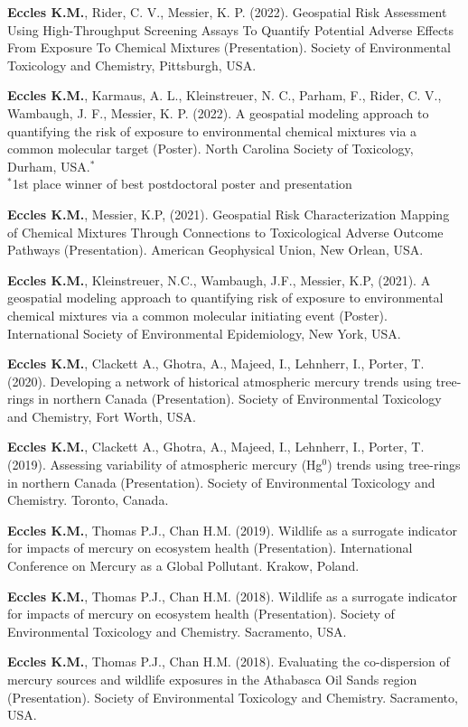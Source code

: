 \documentclass[margin,line]{res}
\begin{document}
\begin{resume}
\textbf{Eccles K.M.}, Rider, C. V., Messier, K. P. (2022). Geospatial Risk Assessment Using High-Throughput Screening Assays To Quantify Potential Adverse Effects From Exposure To Chemical Mixtures (Presentation). Society of Environmental Toxicology and Chemistry, Pittsburgh, USA.

\textbf{Eccles K.M.}, Karmaus, A. L., Kleinstreuer, N. C., Parham, F., Rider, C. V., Wambaugh, J. F., Messier, K. P. (2022). A geospatial modeling approach to quantifying the risk of exposure to environmental chemical mixtures via a common molecular target (Poster). North Carolina Society of Toxicology, Durham, USA.$^{*}$\\
$^{*}$1st place winner of best postdoctoral poster and presentation

\textbf{Eccles K.M.}, Messier, K.P, (2021). Geospatial Risk Characterization Mapping of Chemical Mixtures Through Connections to Toxicological Adverse Outcome Pathways (Presentation). American Geophysical Union, New Orlean, USA.

\textbf{Eccles K.M.}, Kleinstreuer, N.C., Wambaugh, J.F., Messier, K.P, (2021). A geospatial modeling approach to quantifying risk of exposure to environmental chemical mixtures via a common molecular initiating event (Poster). International Society of Environmental Epidemiology, New York, USA.

\textbf{Eccles K.M.}, Clackett A., Ghotra, A., Majeed, I., Lehnherr, I., Porter, T. (2020). Developing a network of historical atmospheric mercury trends using tree-rings in northern Canada (Presentation).  Society of Environmental Toxicology and Chemistry, Fort Worth, USA.

\textbf{Eccles K.M.}, Clackett A., Ghotra, A., Majeed, I., Lehnherr, I., Porter, T. (2019). Assessing variability of atmospheric mercury (Hg$^{0}$) trends using tree-rings in northern Canada (Presentation). Society of Environmental Toxicology and Chemistry. Toronto, Canada.

\textbf{Eccles K.M.}, Thomas P.J., Chan H.M. (2019). Wildlife as a surrogate indicator for impacts of mercury on ecosystem health (Presentation). International Conference on Mercury as a Global Pollutant. Krakow, Poland.

\textbf{Eccles K.M.}, Thomas P.J., Chan H.M. (2018). Wildlife as a surrogate indicator for impacts of mercury on ecosystem health (Presentation). Society of Environmental Toxicology and Chemistry. Sacramento, USA.

\textbf{Eccles K.M.}, Thomas P.J., Chan H.M. (2018). Evaluating the co-dispersion of mercury sources and wildlife exposures in the Athabasca Oil Sands region (Presentation). Society of Environmental Toxicology and Chemistry. Sacramento, USA.


\end{resume}
\end{document}
